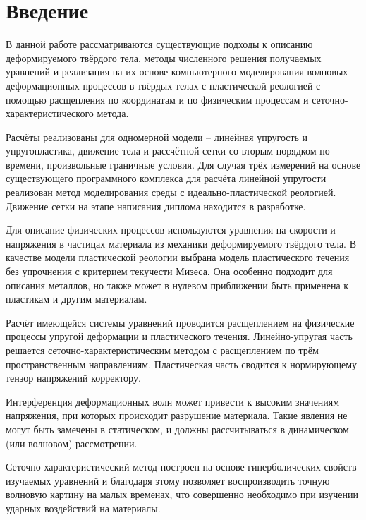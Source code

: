 \section*{Введение}
В данной работе рассматриваются существующие подходы к описанию деформируемого твёрдого тела, методы численного решения получаемых уравнений и реализация на их основе компьютерного моделирования волновых деформационных процессов в твёрдых телах с пластической реологией с помощью расщепления по координатам и по физическим процессам и сеточно-характеристического метода. 

Расчёты реализованы для одномерной модели -- линейная упругость и упругопластика, движение тела и рассчётной сетки со вторым порядком по времени, произвольные граничные условия. Для случая трёх измерений на основе существующего программного комплекса для расчёта линейной упругости реализован метод моделирования среды с идеально-пластической реологией. Движение сетки на этапе написания диплома находится в разработке. 

Для описание физических процессов используются уравнения на скорости и напряжения в частицах материала из механики деформируемого твёрдого тела. В качестве модели пластической реологии выбрана модель пластического течения без упрочнения с критерием текучести Мизеса. Она особенно подходит для описания металлов, но также может в нулевом приближении быть применена к пластикам и другим материалам.

Расчёт имеющейся системы уравнений проводится расщеплением на физические процессы упругой деформации и пластического течения. Линейно-упругая часть решается сеточно-характеристическим методом с расщеплением по трём пространственным направлениям. Пластическая часть сводится к нормирующему тензор напряжений корректору. 

Интерференция деформационных волн может привести к высоким значениям напряжения, при которых происходит разрушение материала. Такие явления не могут быть замечены в статическом, и должны рассчитываться в динамическом (или волновом) рассмотрении.

Сеточно-характеристический метод построен на основе гиперболических свойств изучаемых уравнений и благодаря этому позволяет воспроизводить точную волновую картину на малых временах, что совершенно необходимо при изучении ударных воздействий на материалы.

